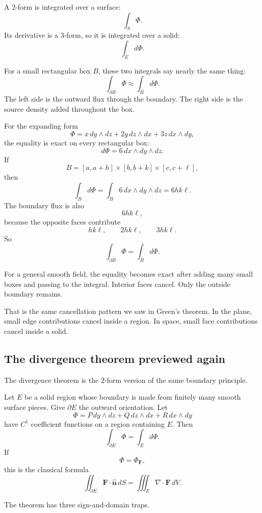 A \(2\)-form is integrated over a surface:
\[
    \int_S \Phi.
\]
Its derivative is a \(3\)-form, so it is integrated over a solid:
\[
    \int_E d\Phi.
\]

For a small rectangular box \(B\), these two integrals say nearly the same thing:
\[
\boxed{
    \int_{\partial B}\Phi
    \approx
    \int_B d\Phi.
}
\]
The left side is the outward flux through the boundary.  The right side is the source
density added throughout the box.

For the expanding form
\[
    \Phi=x\,dy\wedge dz+2y\,dz\wedge dx+3z\,dx\wedge dy,
\]
the equality is exact on every rectangular box:
\[
    d\Phi=6\,dx\wedge dy\wedge dz.
\]
If
\[
    B=[a,a+h]\times[b,b+k]\times[c,c+\ell],
\]
then
\[
    \int_B d\Phi
    =
    \int_B 6\,dx\wedge dy\wedge dz
    =
    6hk\ell.
\]
The boundary flux is also
\[
    6hk\ell,
\]
because the opposite faces contribute
\[
    hk\ell,\qquad 2hk\ell,\qquad 3hk\ell.
\]
So
\[
\boxed{
    \int_{\partial B}\Phi=\int_B d\Phi.
}
\]

For a general smooth field, the equality becomes exact after adding many small boxes
and passing to the integral.  Interior faces cancel.  Only the outside boundary remains.

That is the same cancellation pattern we saw in Green's theorem.  In the plane, small
edge contributions cancel inside a region.  In space, small face contributions cancel
inside a solid.

\subsection{The divergence theorem previewed again}

The divergence theorem is the \(2\)-form version of the same boundary principle.

\begin{theorem}
Let \(E\) be a solid region whose boundary is made from finitely many smooth surface
pieces.  Give \(\partial E\) the outward orientation.  Let
\[
    \Phi=P\,dy\wedge dz+Q\,dz\wedge dx+R\,dx\wedge dy
\]
have \(C^1\) coefficient functions on a region containing \(E\).  Then
\[
\boxed{
    \int_{\partial E}\Phi=\int_E d\Phi.
}
\]
If
\[
    \Phi=\Phi_{\mathbf F},
\]
this is the classical formula
\[
\boxed{
    \iint_{\partial E}\mathbf F\cdot\widehat{\mathbf n}\,dS
    =
    \iiint_E \nabla\cdot\mathbf F\,dV.
}
\]
\end{theorem}

The theorem has three sign-and-domain traps.

